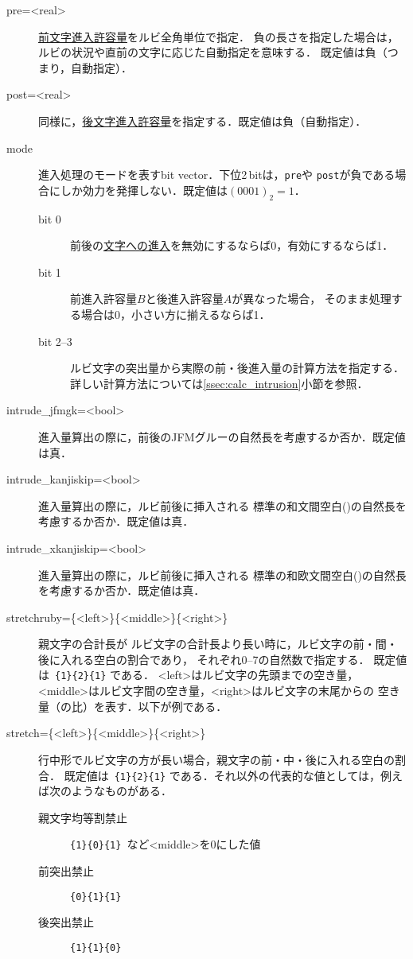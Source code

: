 \documentclass[a4paper,10ptj]{ltjsarticle}
\begin{document}
\begin{description}
\def\makelabel#1{\ttfamily\bfseries #1}
\item[pre=<real>] \underline{前文字進入許容量}をルビ全角単位で指定．
負の長さを指定した場合は，ルビの状況や直前の文字に応じた自動指定を意味する．
既定値は負（つまり，自動指定）．

\item[post=<real>] 同様に，\underline{後文字進入許容量}を指定する．既定値は負（自動指定）．

\item[mode] 進入処理のモードを表すbit vector．下位2\,bitは，\texttt{pre}や
\texttt{post}が負である場合にしか効力を発揮しない．既定値は$(0001)_2 = 1$．
\begin{description}
 \item[bit 0] 前後の\underline{文字への進入}を無効にするならば0，有効にするならば1．
 \item[bit 1] 前進入許容量$B$と後進入許容量$A$が異なった場合，
  そのまま処理する場合は0，小さい方に揃えるならば1．
 \item[bit 2--3] ルビ文字の突出量から実際の前・後進入量の計算方法を指定する．
  詳しい計算方法については\ref{ssec:calc_intrusion}\nobreak 小節を参照．
\end{description}
\item[intrude\_jfmgk=<bool>] 進入量算出の際に，前後のJFMグルーの自然長を考慮するか否か．既定値は真．
\item[intrude\_kanjiskip=<bool>] 進入量算出の際に，ルビ前後に挿入される
  標準の和文間空白()の自然長を
  考慮するか否か．既定値は真．
\item[intrude\_xkanjiskip=<bool>] 進入量算出の際に，ルビ前後に挿入される
  標準の和欧文間空白()の自然長を考慮するか否か．既定値は真．
\item[stretchruby=\{<left>\}\{<middle>\}\{<right>\}] 親文字の合計長が
ルビ文字の合計長より長い時に，ルビ文字の前・間・後に入れる空白の割合であり，
それぞれ0--7の自然数で指定する．
既定値は\ \verb+{1}{2}{1}+ である．
<left>はルビ文字の先頭までの空き量，<middle>はルビ文字間の空き量，<right>はルビ文字の末尾からの
空き量（の比）を表す．以下が例である．
\begin{LTXexample}[width=0.3\textwidth, preset=\Large]
\end{LTXexample}
\item[stretch=\{<left>\}\{<middle>\}\{<right>\}]
行中形でルビ文字の方が長い場合，親文字の前・中・後に入れる空白の割合．
既定値は\ \verb+{1}{2}{1}+ である．それ以外の代表的な値としては，例えば次のようなものがある．
\begin{description}
\item[親文字均等割禁止] \verb+{1}{0}{1}+\ など<middle>を0にした値
\item[前突出禁止] \verb+{0}{1}{1}+
\item[後突出禁止] \verb+{1}{1}{0}+
\end{description}


\end{description}
\end{document}

